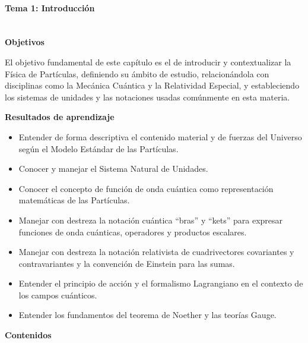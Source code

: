 \paragraph{Tema 1: Introducción\\\\} 

\textbf{Objetivos}

El objetivo fundamental de este capítulo es el de introducir y contextualizar la Física de Partículas, definiendo su ámbito de estudio, relacionándola con disciplinas como la Mecánica Cuántica y la Relatividad Especial, y estableciendo los sistemas de unidades y las notaciones usadas comúnmente en esta materia.  

\textbf{Resultados de aprendizaje}

\begin{itemize}
    \item Entender de forma descriptiva el contenido material y de fuerzas del Universo según el Modelo Estándar de las Partículas. 
    \item Conocer y manejar el Sistema Natural de Unidades.
    \item Conocer el concepto de función de onda cuántica como representación matemáticas de las Partículas.
    \item Manejar con destreza la notación cuántica ``bras'' y ``kets'' para expresar funciones de onda cuánticas, operadores y productos escalares.
    \item Manejar con destreza la notación relativista de cuadrivectores covariantes y contravariantes y la convención de Einstein para las sumas.
    \item Entender el principio de acción y el formalismo Lagrangiano en el contexto de los campos cuánticos.
    \item Entender los fundamentos del teorema de Noether y las teorías Gauge.
\end{itemize}

\textbf{Contenidos}

